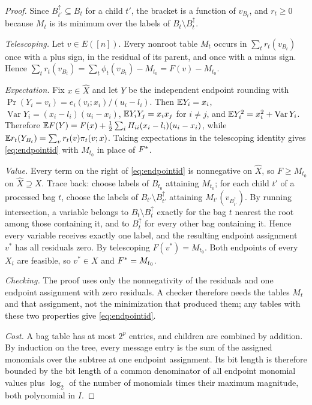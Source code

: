 \begin{proof}
Since $B_{t'}^{\uparrow}\subseteq B_t$ for a child $t'$, the bracket is a
function of $v_{B_t}$, and $r_t\ge0$ because $M_t$ is its minimum over the
labels of $B_t\setminus B_t^\uparrow$.

\emph{Telescoping.} Let $v\in E([n])$. Every nonroot table $M_t$ occurs in
$\sum_tr_t(v_{B_t})$ once with a plus sign, in the residual of its parent, and
once with a minus sign. Hence $\sum_tr_t(v_{B_t})=\sum_t\phi_t(v_{B_t})-M_{t_0}
=F(v)-M_{t_0}$.

\emph{Expectation.} Fix $x\in\hat X$ and let $Y$ be the independent endpoint
rounding with $\Pr(Y_i=v_i)=e_i(v_i;x_i)/(u_i-l_i)$. Then $\mathbb E Y_i=x_i$,
$\operatorname{Var}Y_i=(x_i-l_i)(u_i-x_i)$, $\mathbb E Y_iY_j=x_ix_j$ for $i\ne j$,
and $\mathbb E Y_i^2=x_i^2+\operatorname{Var}Y_i$. Therefore
$\mathbb E F(Y)=F(x)+\frac12\sum_iH_{ii}(x_i-l_i)(u_i-x_i)$, while
$\mathbb E r_t(Y_{B_t})=\sum_vr_t(v)\pi_t(v;x)$. Taking expectations in the
telescoping identity gives \eqref{eq:endpointid} with $M_{t_0}$ in place
of $F^*$.

\emph{Value.} Every term on the right of \eqref{eq:endpointid} is
nonnegative on $\hat X$, so $F\ge M_{t_0}$ on $\hat X\supseteq X$. Trace back:
choose labels of $B_{t_0}$ attaining $M_{t_0}$; for each child $t'$ of a
processed bag $t$, choose the labels of $B_{t'}\setminus B_{t'}^\uparrow$
attaining $M_{t'}(v_{B_{t'}^\uparrow})$. By running intersection, a variable
belongs to $B_t\setminus B_t^\uparrow$ exactly for the bag $t$ nearest the
root among those containing it, and to $B_{t}^{\uparrow}$ for every other bag
containing it. Hence every variable receives exactly one label, and the
resulting endpoint assignment $v^*$ has all residuals zero. By telescoping
$F(v^*)=M_{t_0}$. Both endpoints of every $X_i$ are feasible, so $v^*\in X$
and $F^*=M_{t_0}$.

\emph{Checking.} The proof uses only the nonnegativity of the residuals and
one endpoint assignment with zero residuals. A checker therefore needs the
tables $M_t$ and that assignment, not the minimization that produced them; any
tables with these two properties give \eqref{eq:endpointid}.

\emph{Cost.} A bag table has at most $2^p$ entries, and children are combined
by addition. By induction on the tree, every message entry is the sum of the
assigned monomials over the subtree at one endpoint assignment. Its bit length
is therefore bounded by the bit length of a common denominator of all endpoint
monomial values plus $\log_2$ of the number of monomials times their maximum
magnitude, both polynomial in $I$.
\end{proof}

